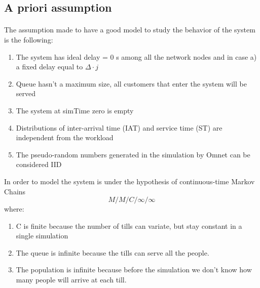 \subsection{A priori assumption}
\paragraph{} 
The assumption made to have a good model to study the behavior of the system is the following:
\begin{enumerate}
	\item The system has ideal  delay = 0 s among all the network nodes and in case a) a fixed delay equal to $\Delta \cdot j$
	\item Queue hasn't a maximum size, all customers that enter the system will be served
	\item The system at simTime zero is empty
	\item Distributions of inter-arrival time (IAT) and service time (ST) are independent from the workload
	\item The pseudo-random numbers generated in the simulation by Omnet can be considered IID
\end{enumerate}
In order to model the system is  under the hypothesis of continuous-time Markov Chains \[M/M/C/\infty/\infty\] where:
\begin{enumerate}
	\item C is finite because the number of tills can variate, but stay constant in a single simulation
	\item The queue is infinite because the tills can serve all the people.
	\item The population is infinite because before the simulation we don’t know how many people will arrive at each till.
\end{enumerate}
